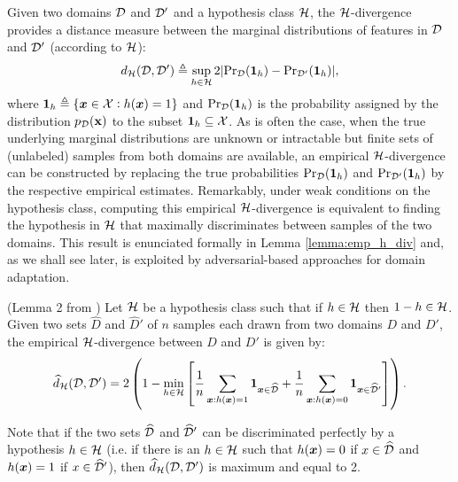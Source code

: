 Given two domains ${\mathcal{D}}$ and ${\mathcal{D}}'$ and a hypothesis class ${\mathcal{H}}$, the ${\mathcal{H}}$-divergence provides a distance measure between the marginal distributions of features in ${\mathcal{D}}$ and ${\mathcal{D}}'$ (according to ${\mathcal{H}}$):
\begin{equation*}
	\label{eq:h_div}
	d_{{\mathcal{H}}}({\mathcal{D}},{\mathcal{D}}') \triangleq \sup_{h \in {\mathcal{H}}} 2 |\mathrm{Pr}_{{\mathcal{D}}}(\bm{1}_h) - \mathrm{Pr}_{{\mathcal{D}}'}(\bm{1}_h)|,
\end{equation*}
where $\bm{1}_h \triangleq \{{\bm{x}} \in {\mathcal{X}}: h({\bm{x}})=1\}$ and $\mathrm{Pr}_{{\mathcal{D}}}(\bm{1}_h)$ is the probability assigned by the distribution $p_{\mathcal{D}}({\mathbf{x}})$ to the subset $\bm{1}_h \subseteq {\mathcal{X}}$. As is often the case, when the true underlying marginal distributions are unknown or intractable but finite sets of (unlabeled) samples from both domains are available, an empirical ${\mathcal{H}}$-divergence can be constructed by replacing the true probabilities $\mathrm{Pr}_{{\mathcal{D}}}(\bm{1}_h)$ and $\mathrm{Pr}_{{\mathcal{D}}'}(\bm{1}_h)$ by the respective empirical estimates. Remarkably, under weak conditions on the hypothesis class, computing this empirical ${\mathcal{H}}$-divergence is equivalent to finding the hypothesis in ${\mathcal{H}}$ that maximally discriminates between samples of the two domains. This result is enunciated formally in Lemma \ref{lemma:emp_h_div} and, as we shall see later, is exploited by adversarial-based approaches for domain adaptation.
\begin{lemma}
	\label{lemma:emp_h_div}
	(Lemma 2 from \citet{BenDavid2010}) Let ${\mathcal{H}}$ be a hypothesis class such that if $h \in {\mathcal{H}}$ then $1-h \in {\mathcal{H}}$. Given two sets $\widehat{D}$ and $\widehat{D}'$ of $n$ samples each drawn from two domains $D$ and $D'$, the empirical ${\mathcal{H}}$-divergence between $D$ and $D'$ is given by:
	\begin{equation}
		\widehat{d}_{{\mathcal{H}}}({\mathcal{D}},{\mathcal{D}}') = 2 \left(1 - \min_{h \in {\mathcal{H}}} \left[\frac{1}{n} \sum_{{\bm{x}}: h({\bm{x}})=1} \bm{1}_{{\bm{x}} \in \widehat{{\mathcal{D}}}} + \frac{1}{n} \sum_{{\bm{x}}: h({\bm{x}})=0} \bm{1}_{{\bm{x}} \in \widehat{{\mathcal{D}}}'}\right]\right).
	\end{equation}
\end{lemma}
Note that if the two sets $\widehat{{\mathcal{D}}}$ and $\widehat{{\mathcal{D}}}'$ can be discriminated perfectly by a hypothesis $h \in {\mathcal{H}}$ (i.e. if there is an $h \in {\mathcal{H}}$ such that $h({\bm{x}}) = 0$ if $x \in \widehat{{\mathcal{D}}}$ and $h({\bm{x}}) = 1$ if $x \in \widehat{{\mathcal{D}}}'$), then $\widehat{d}_{{\mathcal{H}}}({\mathcal{D}},{\mathcal{D}}')$ is maximum and equal to 2.

